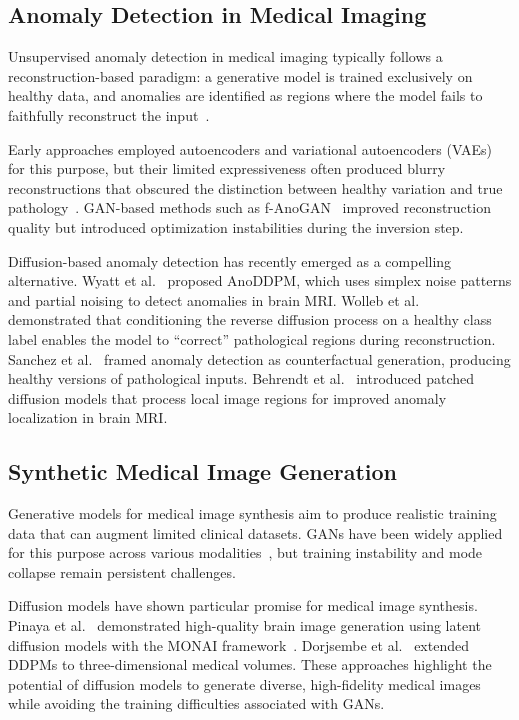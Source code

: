 \subsection{Anomaly Detection in Medical Imaging}

Unsupervised anomaly detection in medical imaging typically follows a reconstruction-based paradigm: a generative model is trained exclusively on healthy data, and anomalies are identified as regions where the model fails to faithfully reconstruct the input~\cite{baur2021autoencoders}.

Early approaches employed autoencoders and variational autoencoders (VAEs)~\cite{kingma2014auto} for this purpose, but their limited expressiveness often produced blurry reconstructions that obscured the distinction between healthy variation and true pathology~\cite{baur2021autoencoders}. GAN-based methods such as f-AnoGAN~\cite{schlegl2019f} improved reconstruction quality but introduced optimization instabilities during the inversion step.

Diffusion-based anomaly detection has recently emerged as a compelling alternative. Wyatt et al.~\cite{wyatt2022anoddpm} proposed AnoDDPM, which uses simplex noise patterns and partial noising to detect anomalies in brain MRI. Wolleb et al.~\cite{wolleb2022diffusion} demonstrated that conditioning the reverse diffusion process on a healthy class label enables the model to ``correct'' pathological regions during reconstruction. Sanchez et al.~\cite{sanchez2022healthy} framed anomaly detection as counterfactual generation, producing healthy versions of pathological inputs. Behrendt et al.~\cite{behrendt2024patched} introduced patched diffusion models that process local image regions for improved anomaly localization in brain MRI.

\subsection{Synthetic Medical Image Generation}

Generative models for medical image synthesis aim to produce realistic training data that can augment limited clinical datasets. GANs have been widely applied for this purpose across various modalities~\cite{yi2019generative}, but training instability and mode collapse remain persistent challenges.

Diffusion models have shown particular promise for medical image synthesis. Pinaya et al.~\cite{pinaya2022brain} demonstrated high-quality brain image generation using latent diffusion models with the MONAI framework~\cite{pinaya2023generative}. Dorjsembe et al.~\cite{dorjsembe2022three} extended DDPMs to three-dimensional medical volumes. These approaches highlight the potential of diffusion models to generate diverse, high-fidelity medical images while avoiding the training difficulties associated with GANs.
